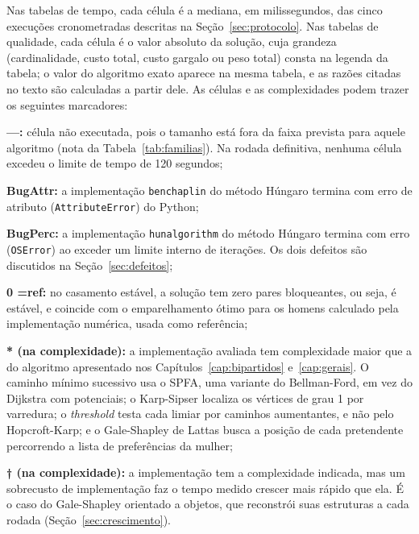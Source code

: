 Nas tabelas de tempo, cada célula é a mediana, em milissegundos, das cinco
execuções cronometradas descritas na Seção~\ref{sec:protocolo}. Nas tabelas de
qualidade, cada célula é o valor absoluto da solução, cuja grandeza (cardinalidade,
custo total, custo gargalo ou peso total) consta na legenda da tabela; o valor do
algoritmo exato aparece na mesma tabela, e as razões citadas no texto são
calculadas a partir dele. As células e as complexidades podem trazer os seguintes
marcadores:

\begin{alineas}
    \item \textbf{---:} célula não executada, pois o tamanho está fora da faixa
    prevista para aquele algoritmo (nota da Tabela~\ref{tab:familias}). Na rodada
    definitiva, nenhuma célula excedeu o limite de tempo de 120 segundos;
    \item \textbf{BugAttr:} a implementação \texttt{benchaplin} do método Húngaro
    termina com erro de atributo (\texttt{AttributeError}) do Python;
    \item \textbf{BugPerc:} a implementação \texttt{hunalgorithm} do método Húngaro
    termina com erro (\texttt{OSError}) ao exceder um limite interno de iterações.
    Os dois defeitos são discutidos na Seção~\ref{sec:defeitos};
    \item \textbf{0 =ref:} no casamento estável, a solução tem zero pares
    bloqueantes, ou seja, é estável, e coincide com o emparelhamento ótimo para os
    homens calculado pela implementação numérica, usada como referência;
    \item \textbf{* (na complexidade):} a implementação avaliada tem complexidade
    maior que a do algoritmo apresentado nos Capítulos~\ref{cap:bipartidos}
    e~\ref{cap:gerais}. O caminho mínimo sucessivo usa o SPFA, uma variante do
    Bellman-Ford, em vez do Dijkstra com potenciais; o Karp-Sipser localiza os
    vértices de grau 1 por varredura; o \textit{threshold} testa cada limiar por
    caminhos aumentantes, e não pelo Hopcroft-Karp; e o Gale-Shapley de Lattas busca
    a posição de cada pretendente percorrendo a lista de preferências da mulher;
    \item \textbf{† (na complexidade):} a implementação tem a complexidade indicada,
    mas um sobrecusto de implementação faz o tempo medido crescer mais rápido que
    ela. É o caso do Gale-Shapley orientado a objetos, que reconstrói suas
    estruturas a cada rodada (Seção~\ref{sec:crescimento}).
\end{alineas}

